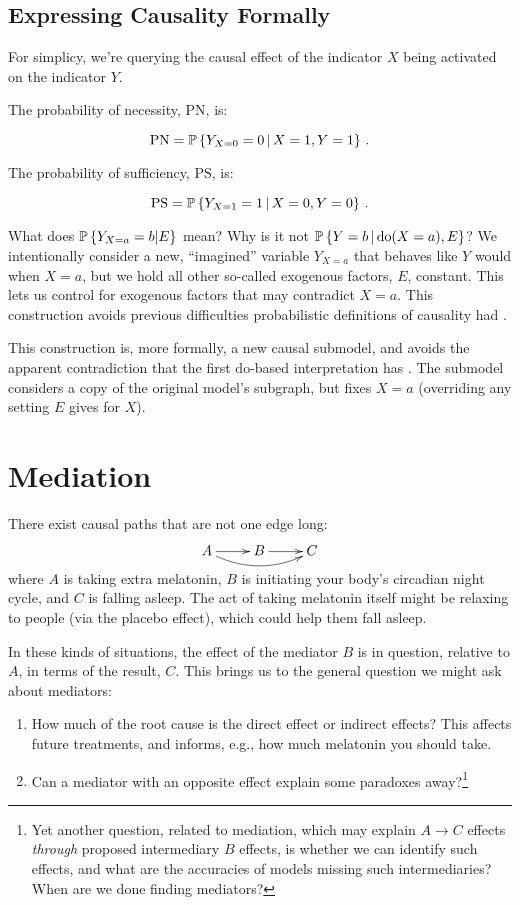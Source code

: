 \documentclass{article}
\begin{document}
\subsection{Expressing Causality Formally}

For simplicy, we're querying the causal effect of the indicator $X$ being activated on the indicator $Y$.

The probability of necessity, $\textrm{PN}$, is:

$$
\textrm{PN}=\operatorname{\mathbb{P}}\left\{ Y_{X=0}=0 \,\middle|\, X=1,Y=1 \right\}\,.
$$

The probability of sufficiency, $\textrm{PS}$, is:

$$
\textrm{PS}=\operatorname{\mathbb{P}}\left\{ Y_{X=1}=1 \,\middle|\, X=0,Y=0 \right\}\,.
$$

What does $\operatorname{\mathbb{P}}\left\{{Y_{X=a}=b|E}\right\}$ mean? Why is it not $\operatorname{\mathbb{P}}\left\{ Y=b \,\middle|\, \mathrm{do}(X=a), E \right\}$?
We intentionally consider a new, ``imagined'' variable $Y_{X=a}$ that behaves like $Y$ would when $X=a$, but we hold all other so-called exogenous factors, $E$, constant. This lets us control for exogenous factors that may contradict $X=a$. This construction avoids previous difficulties probabilistic definitions of causality had \cite{pearl1999probabilities}.

This construction is, more formally, a new causal submodel, and avoids the apparent contradiction that the first $\mathrm{do}$-based interpretation has \cite{pearl1999probabilities}. The submodel considers a copy of the original model's subgraph, but fixes $X=a$ (overriding any setting $E$ gives for $X$).

\section{Mediation}

There exist causal paths that are not one edge long:
$$\xymatrix{
  A \ar[r]\ar@/_10pt/[rr] & B \ar[r] & C
}
$$
where $A$ is taking extra melatonin, $B$ is initiating your body's circadian night cycle, and $C$ is falling asleep. The act of taking melatonin itself might be relaxing to people (via the placebo effect), which could help them fall asleep.

In these kinds of situations, the effect of the mediator $B$ is in question, relative to $A$, in terms of the result, $C$. This brings us to the general question we might ask about mediators:

\begin{enumerate}
\item How much of the root cause is the direct effect or indirect effects? This affects future treatments, and informs, e.g., how much melatonin you should take.
\item Can a mediator with an opposite effect explain some paradoxes away?\footnote{Yet another question, related to mediation, which may explain $A\rightarrow C$ effects \textit{through} proposed intermediary $B$ effects, is whether we can identify such effects, and what are the accuracies of models missing such intermediaries? When are we done finding mediators?}
\end{enumerate}
\end{document}
